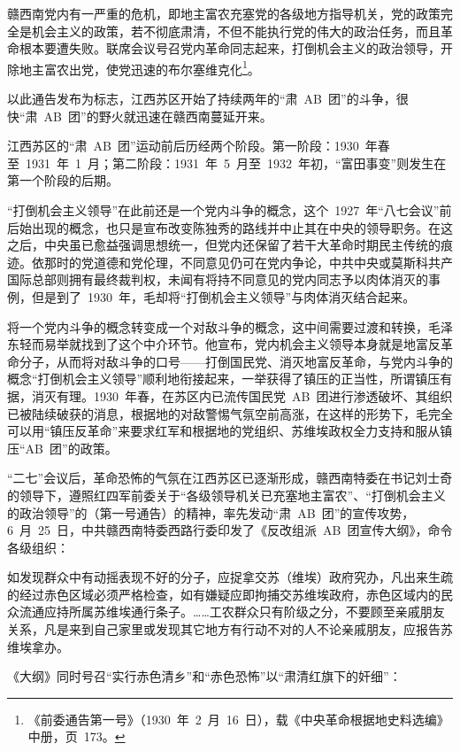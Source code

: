 \begin{quoting}
赣西南党内有一严重的危机，即地主富农充塞党的各级地方指导机关，党的政策完全是机会主义的政策，若不彻底肃清，不但不能执行党的伟大的政治任务，而且革命根本要遭失败。联席会议号召党内革命同志起来，打倒机会主义的政治领导，开除地主富农出党，使党迅速的布尔塞维克化\footnote{《前委通告第一号》（1930~年~2~月~16~日），载《中央革命根据地史料选编》中册，页~173。}。
\end{quoting}

以此通告发布为标志，江西苏区开始了持续两年的“肃~AB~团”的斗争，很快“肃~AB~团”的野火就迅速在赣西南蔓延开来。

江西苏区的“肃~AB~团”运动前后历经两个阶段。第一阶段：1930~年春至~1931~年~1~月；第二阶段：1931~年~5~月至~1932~年初，“富田事变”则发生在第一个阶段的后期。

“打倒机会主义领导”在此前还是一个党内斗争的概念，这个~1927~年“八七会议”前后始出现的概念，也只是宣布改变陈独秀的路线并中止其在中央的领导职务。在这之后，中央虽已愈益强调思想统一，但党内还保留了若干大革命时期民主传统的痕迹。依那时的党道德和党伦理，不同意见仍可在党内争论，中共中央或莫斯科共产国际总部则拥有最终裁判权，未闻有将持不同意见的党内同志予以肉体消灭的事例，但是到了~1930~年，毛却将“打倒机会主义领导”与肉体消灭结合起来。

将一个党内斗争的概念转变成一个对敌斗争的概念，这中间需要过渡和转换，毛泽东轻而易举就找到了这个中介环节。他宣布，党内机会主义领导本身就是地富反革命分子，从而将对敌斗争的口号——打倒国民党、消灭地富反革命，与党内斗争的概念“打倒机会主义领导”顺利地衔接起来，一举获得了镇压的正当性，所谓镇压有据，消灭有理。1930~年春，在苏区内已流传国民党~AB~团进行渗透破坏、其组织已被陆续破获的消息，根据地的对敌警惕气氛空前高涨，在这样的形势下，毛完全可以用“镇压反革命”来要求红军和根据地的党组织、苏维埃政权全力支持和服从镇压“AB~团”的政策。

“二七”会议后，革命恐怖的气氛在江西苏区已逐渐形成，赣西南特委在书记刘士奇的领导下，遵照红四军前委关于“各级领导机关已充塞地主富农”、“打倒机会主义的政治领导”的（第一号通告）的精神，率先发动“肃~AB~团”的宣传攻势，6~月~25~日，中共赣西南特委西路行委印发了《反改组派~AB~团宣传大纲》，命令各级组织：

\begin{quoting}
如发现群众中有动摇表现不好的分子，应捉拿交苏（维埃）政府究办，凡出来生疏的经过赤色区域必须严格检查，如有嫌疑应即拘捕交苏维埃政府，赤色区域内的民众流通应持所属苏维埃通行条子。……工农群众只有阶级之分，不要顾至亲戚朋友关系，凡是来到自己家里或发现其它地方有行动不对的人不论亲戚朋友，应报告苏维埃拿办。
\end{quoting}
《大纲》同时号召“实行赤色清乡”和“赤色恐怖”以“肃清红旗下的奸细”：

